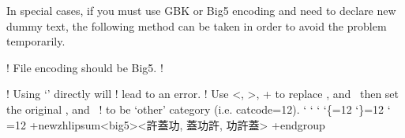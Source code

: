 \documentclass{ctxdoc}
\begin{document}
In special cases, if you must use GBK or Big5 encoding and need
to declare new dummy text, the following method can be taken in
order to avoid the problem temporarily.

\begin{ctexexam}
  ! File encoding should be Big5.
  ! \usepackage[encoding=big5]{zhlipsum}

  ! Using `' directly will
  ! lead to an error.
  ! Use <, >, + to replace {, } and \, then set the original {, } and \
  ! to be `other' category (i.e. catcode=12).
  \begingroup
    \catcode`
    \catcode`
    \catcode`
    \catcode`\{=12
    \catcode`\}=12
    \catcode`\\=12
    +newzhlipsum<big5><許蓋功, 蓋功許, 功許蓋>
  +endgroup
  \zhlipsum[name=big5]
\end{ctexexam}
\end{document}
